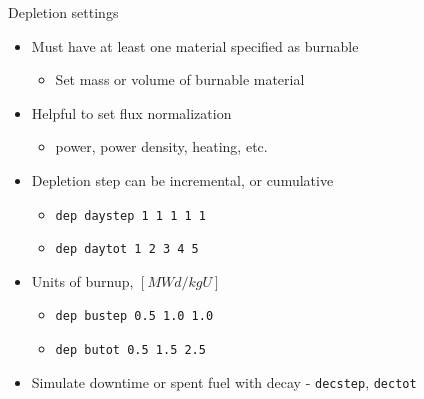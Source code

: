 \documentclass{beamer}
\begin{document}
\begin{frame}{Depletion settings}
    \begin{itemize}
        \item Must have at least one material specified as burnable
        \begin{itemize}
            \item Set mass or volume of burnable material
        \end{itemize}
        \item Helpful to set flux normalization
        \begin{itemize}
            \item power, power density, heating, etc.
        \end{itemize}
        \item Depletion step can be incremental, or cumulative
        \begin{itemize}
            \item \texttt{dep daystep 1 1 1 1 1}
            \item \texttt{dep daytot 1 2 3 4 5}
        \end{itemize}
        \item Units of burnup, $[MWd/kgU]$
        \begin{itemize}
            \item{\texttt{dep bustep 0.5 1.0 1.0}}
            \item{\texttt{dep butot 0.5 1.5 2.5}}
        \end{itemize}
        \item{Simulate downtime or spent fuel with decay - \texttt{decstep}, \texttt{dectot}}
    \end{itemize}
\end{frame}
\end{document}
